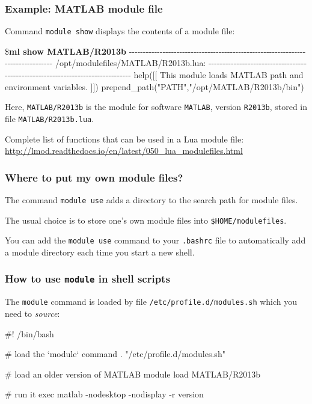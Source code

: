 \documentclass[english,serif,mathserif,usenames,dvipsnames]{beamer}
\begin{document}
\begin{frame}[fragile]
  \frametitle{Example: MATLAB module file}
  \small

  Command \texttt{module show} displays the contents of a module file:
\begin{semiverbatim}\tiny\ttfamily
\${\bfseries ml show MATLAB/R2013b}
-{}-{}-{}-{}-{}-{}-{}-{}-{}-{}-{}-{}-{}-{}-{}-{}-{}-{}-{}-{}-{}-{}-{}-{}-{}-{}-{}-{}-{}-{}-{}-{}-{}-{}-{}-{}-{}-{}-{}-{}-{}-{}-{}-{}-{}-{}-{}-{}-{}-{}-{}-{}-{}-{}-{}-{}-{}-{}-{}-{}-{}-{}-{}-{}-{}-{}-{}-{}-{}-{}-{}-{}-{}-{}-{}-{}-{}-{}-{}-{}
   /opt/modulefiles/MATLAB/R2013b.lua:
-{}-{}-{}-{}-{}-{}-{}-{}-{}-{}-{}-{}-{}-{}-{}-{}-{}-{}-{}-{}-{}-{}-{}-{}-{}-{}-{}-{}-{}-{}-{}-{}-{}-{}-{}-{}-{}-{}-{}-{}-{}-{}-{}-{}-{}-{}-{}-{}-{}-{}-{}-{}-{}-{}-{}-{}-{}-{}-{}-{}-{}-{}-{}-{}-{}-{}-{}-{}-{}-{}-{}-{}-{}-{}-{}-{}-{}-{}-{}-{}
help([[
  This module loads MATLAB path and environment variables.
]])
prepend_path("PATH","/opt/MATLAB/R2013b/bin")
\end{semiverbatim}

  \+ Here, \texttt{MATLAB/R2013b} is the module for software
  \texttt{MATLAB}, version \texttt{R2013b}, stored in file
  \texttt{MATLAB/R2013b.lua}.

  \+
  Complete list of functions that can be used in a Lua module file:
  \url{http://lmod.readthedocs.io/en/latest/050_lua_modulefiles.html}
\end{frame}


\begin{frame}
  \frametitle{Where to put my own module files?}

  The command \texttt{module use} adds a directory to the search path
  for module files.

  \+ The usual choice is to store one's own module files into
  \texttt{\$HOME/modulefiles}.

  \+ You can add the \texttt{module use} command to your
  \texttt{.bashrc} file to automatically add a module directory each
  time you start a new shell.
\end{frame}


\begin{frame}[fragile]
  \frametitle{How to use \texttt{module} in shell scripts}

  The \texttt{module} command is loaded by file
  \texttt{/etc/profile.d/modules.sh} which you need to \emph{source}:

\begin{sh}
  #! /bin/bash

  # load the `module` command
  . "/etc/profile.d/modules.sh"

  # load an older version of MATLAB
  module load MATLAB/R2013b

  # run it
  exec matlab -nodesktop -nodisplay -r version
\end{sh}
\end{frame}
\end{document}

